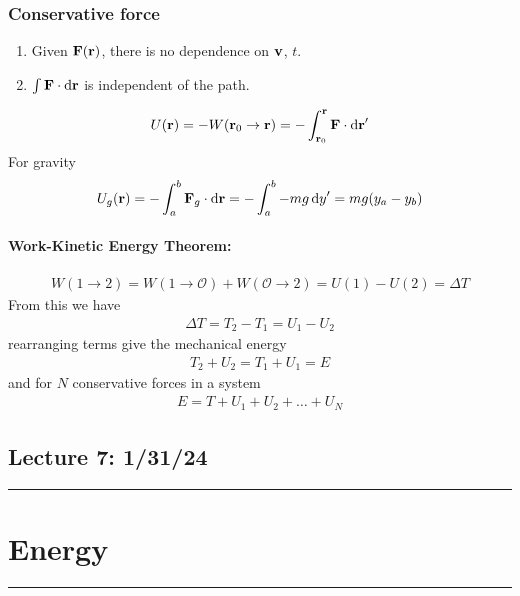 \documentclass[../main.tex]{subfiles}
\begin{document}
\subsubsection*{Conservative force}
\begin{enumerate}
    \item Given $\vb{F}(\vb{r})$, there is no dependence on $\vb{v}$, $t$.
    \item $\int \vb{F} \cdot \dd{\vb{r}}$ is independent of the path.
\end{enumerate}
\begin{align*}
    U(\vb{r}) = -W (\vb{r}_0 \to \vb{r}) = -\int_{\vb{r}_0}^{\vb{r}} \vb{F} \cdot \dd{\vb{r}}'
\end{align*}
For gravity
\begin{align*}
    U_g (\vb{r}) = - \int_a^b \vb{F}_g \cdot \dd{\vb{r}} = - \int_a^b -mg \dd{y}' = mg(y_a - y_b)
\end{align*}
\paragraph{Work-Kinetic Energy Theorem:}
\begin{align*}
    W(1 \to 2) = W(1 \to \mathcal{O}) + W(\mathcal{O} \to 2) = U(1) - U(2) = \Delta T
\end{align*}
From this we have
\begin{align*}
    \Delta T = T_2 - T_1 = U_1 - U_2
\end{align*}
rearranging terms give the mechanical energy
\begin{align*}
    T_2 + U_2 = T_1 + U_1 = E
\end{align*}
and for $N$ conservative forces in a system
\begin{align*}
    E = T + U_1 + U_2 + \dots + U_N
\end{align*}

\pagebreak
\subsection*{Lecture 7: \hfill  1/31/24}
\hrule \vspace{10px}
\section{Energy}
\hrule \vspace{10px}
\end{document}

